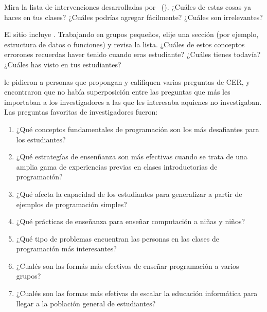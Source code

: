 
Mira la lista de intervenciones desarrolladas por~\cite{Viha2014} ().
¿Cuáles de estas cosas ya haces en tus clases?
¿Cuáles podrías agregar fácilmente?
¿Cuáles son irrelevantes?


El sitio  
incluye .
Trabajando en grupos pequeños,
elije una sección (por ejemplo, estructura de datos o funciones) y revisa la lista.
¿Cuáles de estos conceptos errorones recuerdas haver tenido cuando eras estudiante?
¿Cuáles tienes todavía?
¿Cuáles has visto en tus estudiantes?


\cite{Denn2019} le pidieron a personas que propongan y califiquen varias preguntas de CER,
y encontraron que no había superposición entre las preguntas que más les importaban a los investigadores
a las que les interesaba aquienes no investigaban.
Las preguntas favoritas de investigadores fueron:

\begin{enumerate}

\item                              
  ¿Qué conceptos fundamentales de programación son los más desafiantes para los estudiantes?

\item
  ¿Qué estrategías de ensenñanza son más efectivas cuando se trata de una amplia gama de experiencias previas en clases introductorias de programación?

\item
  ¿Qué afecta la capacidad de los estudiantes para generalizar a partir de ejemplos de programación simples?

\item
  ¿Qué prácticas de enseñanza para enseñar computación a niñas y niños?

\item
  ¿Qué tipo de problemas encuentran las personas en las clases de programación más interesantes?    

\item
  ¿Cualés son las formás más efectivas de enseñar programación a varios grupos?

\item
  ¿Cualés son las formas más efetivas de escalar la educación informática para llegar a la población general de estudiantes?

\end{enumerate}


